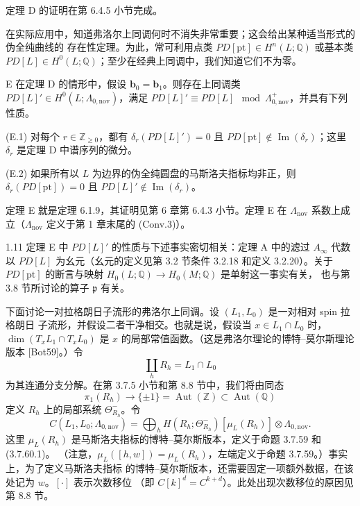 定理 D 的证明在第 6.4.5 小节完成。

在实际应用中，知道弗洛尔上同调何时不消失非常重要；这会给出某种适当形式的伪全纯曲线的
存在性定理。为此，常可利用点类 $PD[\mathrm{pt}]\in H^n(L;\mathbb Q)$ 或基本类
$PD[L]\in H^0(L;\mathbb Q)$；至少在经典上同调中，我们知道它们不为零。

\begin{theorem}{E}\label{thm:E}
在定理 D 的情形中，假设 $\mathbf b_0=\mathbf b_1$。则存在上同调类
$PD[L]'\in H^0(L;\Lambda_{0,\mathrm{nov}})$，满足
$PD[L]'\equiv PD[L]\mod\Lambda^+_{0,\mathrm{nov}}$，并具有下列性质。

\textup{(E.1)} 对每个 $r\in\mathbb Z_{\geq0}$，都有
$\delta_r(PD[L]')=0$ 且 $PD[\mathrm{pt}]\notin\operatorname{Im}(\delta_r)$；这里
$\delta_r$ 是定理 D 中谱序列的微分。

\textup{(E.2)} 如果所有以 $L$ 为边界的伪全纯圆盘的马斯洛夫指标均非正，则
$\delta_r(PD[\mathrm{pt}])=0$ 且 $PD[L]'\notin\operatorname{Im}(\delta_r)$。
\end{theorem}

定理 E 就是定理 6.1.9，其证明见第 6 章第 6.4.3 小节。定理 E 在
$\Lambda_{\mathrm{nov}}$ 系数上成立（$\Lambda_{\mathrm{nov}}$ 定义于第 1 章末尾的 (Conv.3)）。

\begin{remark}{1.11}\label{rem:1-11}
定理 E 中 $PD[L]'$ 的性质与下述事实密切相关：定理 A 中的滤过 $A_\infty$ 代数以
$PD[L]$ 为幺元（幺元的定义见第 3.2 节条件 3.2.18 和定义 3.2.20）。关于
$PD[\mathrm{pt}]$ 的断言与映射 $H_0(L;\mathbb Q)\to H_0(M;\mathbb Q)$ 是单射这一事实有关，
也与第 3.8 节所讨论的算子 $\mathfrak p$ 有关。
\end{remark}

下面讨论一对拉格朗日子流形的弗洛尔上同调。设 $(L_1,L_0)$ 是一对相对 spin 拉格朗日
子流形，并假设二者干净相交。也就是说，假设当 $x\in L_1\cap L_0$ 时，
$\dim(T_xL_1\cap T_xL_0)$ 是 $x$ 的局部常值函数。（这是弗洛尔理论的博特--莫尔斯理论
版本 [Bot59]。）令
\[
  \coprod_hR_h=L_1\cap L_0
\]
为其连通分支分解。在第 3.7.5 小节和第 8.8 节中，我们将由同态
\[
  \pi_1(R_h)\longrightarrow\{\pm1\}=\operatorname{Aut}(\mathbb Z)
  \subset\operatorname{Aut}(\mathbb Q)
\]
定义 $R_h$ 上的局部系统 $\Theta^-_{R_h}$。令
\[
  C(L_1,L_0;\Lambda_{0,\mathrm{nov}})
  =\bigoplus_h H(R_h;\Theta^-_{R_h})[\mu_L(R_h)]
  \otimes\Lambda_{0,\mathrm{nov}}.
\]
这里 $\mu_L(R_h)$ 是马斯洛夫指标的博特--莫尔斯版本，定义于命题 3.7.59 和 (3.7.60.1)。
（注意，$\mu_L([h,w])=\mu_L(R_h)$，左端定义于命题 3.7.59。）事实上，为了定义马斯洛夫指标
的博特--莫尔斯版本，还需要固定一项额外数据，在该处记为 $w$。$[\mathord\cdot]$ 表示次数移位
（即 $C[k]^d=C^{k+d}$）。此处出现次数移位的原因见第 8.8 节。

